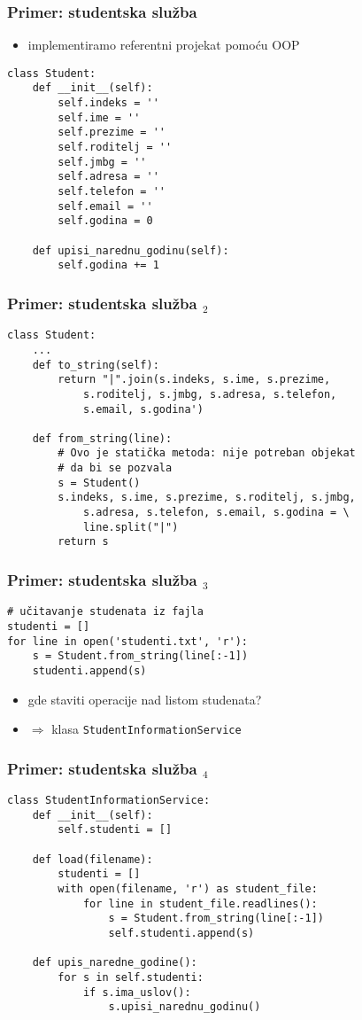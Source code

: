 \documentclass[utf8,compress,aspectratio=169]{beamer}
\begin{document}
\begin{frame}[fragile]
  \frametitle{Primer: studentska služba}
  \begin{itemize}
    \item implementiramo referentni projekat pomoću OOP
  \end{itemize}
\begin{verbatim}
class Student:
    def __init__(self):
        self.indeks = ''
        self.ime = ''
        self.prezime = ''
        self.roditelj = ''
        self.jmbg = ''
        self.adresa = ''
        self.telefon = ''
        self.email = ''
        self.godina = 0

    def upisi_narednu_godinu(self):
        self.godina += 1

\end{verbatim}
\end{frame}

\begin{frame}[fragile,shrink=10]
  \frametitle{Primer: studentska služba $_2$}
\begin{verbatim}
class Student:
    ...
    def to_string(self):
        return "|".join(s.indeks, s.ime, s.prezime,
            s.roditelj, s.jmbg, s.adresa, s.telefon,
            s.email, s.godina')

    def from_string(line):
        # Ovo je statička metoda: nije potreban objekat
        # da bi se pozvala
        s = Student()
        s.indeks, s.ime, s.prezime, s.roditelj, s.jmbg,
            s.adresa, s.telefon, s.email, s.godina = \
            line.split("|")
        return s
\end{verbatim}
\end{frame}

\begin{frame}[fragile]
  \frametitle{Primer: studentska služba $_3$}
\begin{verbatim}
# učitavanje studenata iz fajla
studenti = []
for line in open('studenti.txt', 'r'):
    s = Student.from_string(line[:-1])
    studenti.append(s)
\end{verbatim}
  \begin{itemize}
    \item gde staviti operacije nad listom studenata?
    \item $\Rightarrow$ klasa \texttt{StudentInformationService}
  \end{itemize}
\end{frame}

\begin{frame}[fragile]
  \frametitle{Primer: studentska služba $_4$}
\begin{verbatim}
class StudentInformationService:
    def __init__(self):
        self.studenti = []

    def load(filename):
        studenti = []
        with open(filename, 'r') as student_file:
            for line in student_file.readlines():
                s = Student.from_string(line[:-1])
                self.studenti.append(s)

    def upis_naredne_godine():
        for s in self.studenti:
            if s.ima_uslov():
                s.upisi_narednu_godinu()
\end{verbatim}
\end{frame}
\end{document}
